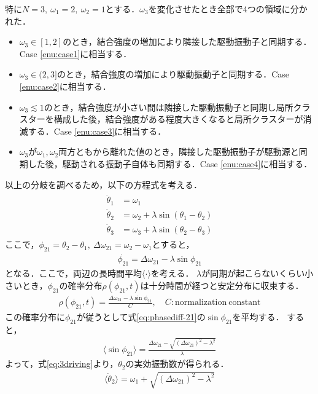 \documentclass[../main]{subfiles}
\begin{document}
特に$N=3,\ \omega_1=2,\ \omega_2=1$とする．$\omega_3$を変化させたとき全部で4つの領域に分かれた．
\begin{itemize}
    \item $\omega_3\in[1,2]$のとき，結合強度の増加により隣接した駆動振動子と同期する．Case \ref{enu:case1}に相当する．
    \item $\omega_3\in(2,3]$のとき，結合強度の増加により駆動振動子と同期する．Case \ref{enu:case2}に相当する．
    \item $\omega_3\lesssim 1$のとき，結合強度が小さい間は隣接した駆動振動子と同期し局所クラスターを構成した後，結合強度がある程度大きくなると局所クラスターが消滅する．Case \ref{enu:case3}に相当する．
    \item $\omega_3$が$\omega_1,\omega_2$両方ともから離れた値のとき，隣接した駆動振動子が駆動源と同期した後，駆動される振動子自体も同期する．Case \ref{enu:case4}に相当する．
\end{itemize}
以上の分岐を調べるため，以下の方程式を考える．
\begin{align}
    \label{eq:3driving}
    \begin{split}
        \dot{\theta}_1&=\omega_1\\
        \dot{\theta}_2&=\omega_2+\lambda\sin(\theta_1-\theta_2)\\
        \dot{\theta}_3&=\omega_3+\lambda\sin(\theta_2-\theta_3)
    \end{split}
\end{align}
ここで，$\phi_{21}=\theta_2-\theta_1,\ \Delta\omega_{21}=\omega_2-\omega_1$とすると，
\begin{align}
    \label{eq:phasediff-21}
    \dot{\phi_{21}}=\Delta\omega_{21}-\lambda\sin\phi_{21}
\end{align}
となる．ここで，両辺の長時間平均$\langle\cdot\rangle$を考える．
$\lambda$が同期が起こらないくらい小さいとき，$\phi_{21}$の確率分布$\rho(\phi_{21},t)$は十分時間が経つと安定分布に収束する．
\begin{align*}
    \rho(\phi_{21},t)=\frac{\Delta\omega_{21}-\lambda\sin\phi_{21}}{C},\quad C:\mathrm{normalization\ constant}
\end{align*}
この確率分布に$\phi_{21}$が従うとして式\eqref{eq:phasediff-21}の$\sin\phi_{21}$を平均する．
すると，
\begin{align*}
    \langle\sin\phi_{21}\rangle=\frac{\Delta\omega_{21}-\sqrt{(\Delta\omega_{21})^2-\lambda^2}}{\lambda}
\end{align*}
よって，式\eqref{eq:3driving}より，$\theta_2$の実効振動数が得られる．
\begin{align*}
    \langle\dot{\theta}_2\rangle=\omega_1+\sqrt{(\Delta\omega_{21})^2-\lambda^2}
\end{align*}
\end{document}
